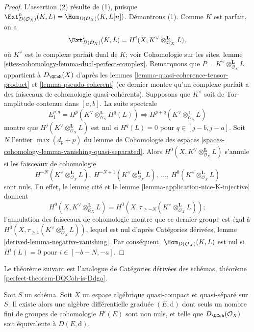 \begin{proof}
L'assertion (2) r\'esulte de (1), puisque
$\Ext^n_{D(\mathcal{O}_X)}(K,L)=
\Hom_{D(\mathcal{O}_X)}(K,L[n])$. D\'emontrons (1). Comme $K$ est parfait, on a
$$
\Ext^i_{D(\mathcal{O}_X)}(K, L) =
H^i(X, K^\vee \otimes_{\mathcal{O}_X}^\mathbf{L} L),
$$
o\`u $K^\vee$ est le complexe parfait dual de $K$; voir Cohomologie sur les
sites, lemme \ref{sites-cohomology-lemma-dual-perfect-complex}. Remarquons que
$P=K^\vee\otimes_{\mathcal{O}_X}^\mathbf{L}L$ appartient \`a $D_\QCoh(X)$
d'apr\`es les lemmes \ref{lemma-quasi-coherence-tensor-product} et
\ref{lemma-pseudo-coherent} (ce dernier montre qu'un complexe parfait a des
faisceaux de cohomologie quasi-coh\'erents). Supposons que $K^\vee$ soit de
Tor-amplitude contenue dans $[a,b]$. La suite spectrale
$$
E_1^{p, q} = H^p(K^\vee \otimes_{\mathcal{O}_X}^\mathbf{L} H^q(L))
\Rightarrow
H^{p + q}(K^\vee \otimes_{\mathcal{O}_X}^\mathbf{L} L)
$$
montre que $H^j(K^\vee\otimes_{\mathcal{O}_X}^\mathbf{L}L)$ est nul si
$H^q(L)=0$ pour $q\in[j-b,j-a]$. Soit $N$ l'entier
$\max(d_p+p)$ du lemme de Cohomologie des espaces
\ref{spaces-cohomology-lemma-vanishing-quasi-separated}. Alors
$H^0(X,K^\vee\otimes_{\mathcal{O}_X}^\mathbf{L}L)$ s'annule si les faisceaux de
cohomologie
$$
H^{-N}(K^\vee \otimes_{\mathcal{O}_X}^\mathbf{L} L),
\ H^{-N + 1}(K^\vee \otimes_{\mathcal{O}_X}^\mathbf{L} L),
\ \ldots,
\ H^0(K^\vee \otimes_{\mathcal{O}_X}^\mathbf{L} L)
$$
sont nuls. En effet, le lemme cit\'e et le lemme
\ref{lemma-application-nice-K-injective} donnent
$$
H^0(X, K^\vee \otimes_{\mathcal{O}_X}^\mathbf{L} L) =
H^0(X, \tau_{\geq -N}(K^\vee \otimes_{\mathcal{O}_X}^\mathbf{L} L));
$$
l'annulation des faisceaux de cohomologie montre que ce dernier groupe est
\'egal \`a
$H^0(X,\tau_{\geq1}(K^\vee\otimes_{\mathcal{O}_X}^\mathbf{L}L))$, lequel est
nul d'apr\`es Cat\'egories d\'eriv\'ees, lemme
\ref{derived-lemma-negative-vanishing}. Par cons\'equent,
$\Hom_{D(\mathcal{O}_X)}(K,L)$ est nul si $H^i(L)=0$ pour
$i\in[-b-N,-a]$.
\end{proof}

\noindent
Le th\'eor\`eme suivant est l'analogue de Cat\'egories d\'eriv\'ees des sch\'emas,
th\'eor\`eme \ref{perfect-theorem-DQCoh-is-Ddga}.

\begin{theorem}
\label{theorem-DQCoh-is-Ddga}
Soit $S$ un sch\'ema. Soit $X$ un espace alg\'ebrique quasi-compact et
quasi-s\'epar\'e sur $S$. Il existe alors une alg\`ebre diff\'erentielle gradu\'ee
$(E,\text{d})$ dont seuls un nombre fini de groupes de cohomologie $H^i(E)$
sont non nuls, et telle que $D_\QCoh(\mathcal{O}_X)$ soit \'equivalente \`a
$D(E,\text{d})$.
\end{theorem}

